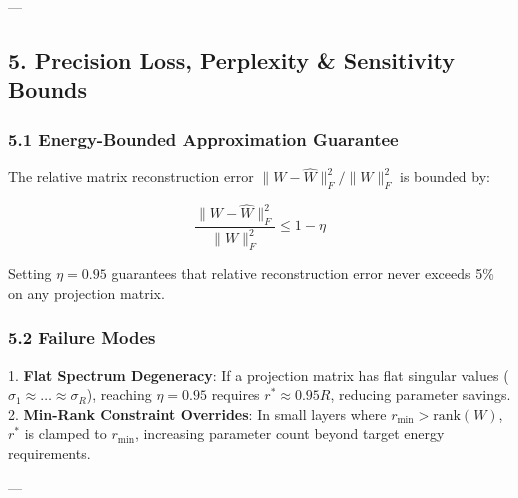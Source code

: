 ---

\subsection{5. Precision Loss, Perplexity \& Sensitivity Bounds}
\subsubsection{5.1 Energy-Bounded Approximation Guarantee}
The relative matrix reconstruction error $\|W - \hat{W}\|_F^2 / \|W\|_F^2$ is bounded by:

\[
\frac{\|W - \hat{W}\|_F^2}{\|W\|_F^2} \le 1 - \eta
\]

Setting $\eta = 0.95$ guarantees that relative reconstruction error never exceeds 5\% on any projection matrix.

\subsubsection{5.2 Failure Modes}
1. \textbf{Flat Spectrum Degeneracy}: If a projection matrix has flat singular values ($\sigma_1 \approx \dots \approx \sigma_R$), reaching $\eta = 0.95$ requires $r^* \approx 0.95 R$, reducing parameter savings.
2. \textbf{Min-Rank Constraint Overrides}: In small layers where $r_{\min} > \text{rank}(W)$, $r^*$ is clamped to $r_{\min}$, increasing parameter count beyond target energy requirements.

---